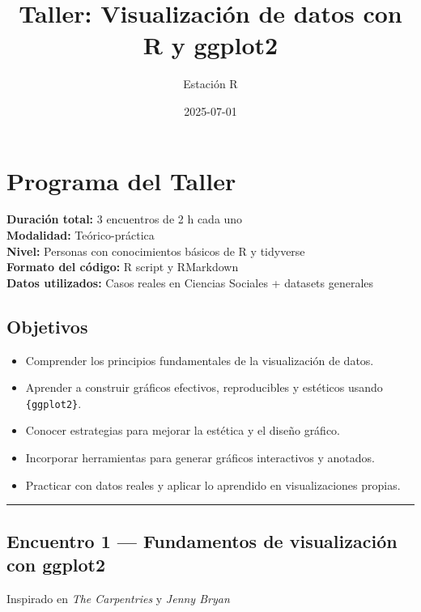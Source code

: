 \documentclass[
  11pt,
  letterpaper,
  DIV=11,
  numbers=noendperiod]{scrartcl}
\title{Taller: Visualización de datos con R y ggplot2}
\author{Estación R}
\date{2025-07-01}
\providecommand{\tightlist}{%
  \setlength{\itemsep}{0pt}\setlength{\parskip}{0pt}}\usepackage{longtable,booktabs,array}
\begin{document}
\maketitle


\section{Programa del Taller}\label{programa-del-taller}

\textbf{Duración total:} 3 encuentros de 2 h cada uno\\
\textbf{Modalidad:} Teórico-práctica\\
\textbf{Nivel:} Personas con conocimientos básicos de R y tidyverse\\
\textbf{Formato del código:} R script y RMarkdown\\
\textbf{Datos utilizados:} Casos reales en Ciencias Sociales + datasets
generales

\subsection{Objetivos}\label{objetivos}

\begin{itemize}
\tightlist
\item
  Comprender los principios fundamentales de la visualización de datos.
\item
  Aprender a construir gráficos efectivos, reproducibles y estéticos
  usando \texttt{\{ggplot2\}}.
\item
  Conocer estrategias para mejorar la estética y el diseño gráfico.
\item
  Incorporar herramientas para generar gráficos interactivos y anotados.
\item
  Practicar con datos reales y aplicar lo aprendido en visualizaciones
  propias.
\end{itemize}

\begin{center}\rule{0.5\linewidth}{0.5pt}\end{center}

\subsection{Encuentro 1 --- Fundamentos de visualización con
ggplot2}\label{encuentro-1-fundamentos-de-visualizaciuxf3n-con-ggplot2}

Inspirado en \emph{The Carpentries} y \emph{Jenny Bryan}
\end{document}
